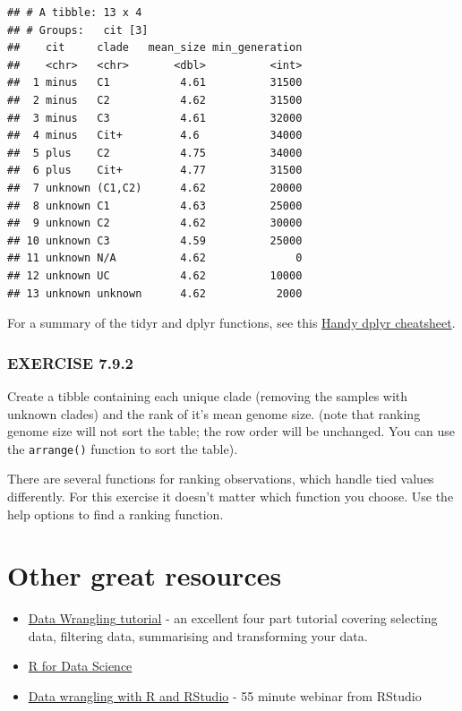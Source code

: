 \documentclass[
]{book}
\providecommand{\tightlist}{%
  \setlength{\itemsep}{0pt}\setlength{\parskip}{0pt}}
\begin{document}
\begin{verbatim}
## # A tibble: 13 x 4
## # Groups:   cit [3]
##    cit     clade   mean_size min_generation
##    <chr>   <chr>       <dbl>          <int>
##  1 minus   C1           4.61          31500
##  2 minus   C2           4.62          31500
##  3 minus   C3           4.61          32000
##  4 minus   Cit+         4.6           34000
##  5 plus    C2           4.75          34000
##  6 plus    Cit+         4.77          31500
##  7 unknown (C1,C2)      4.62          20000
##  8 unknown C1           4.63          25000
##  9 unknown C2           4.62          30000
## 10 unknown C3           4.59          25000
## 11 unknown N/A          4.62              0
## 12 unknown UC           4.62          10000
## 13 unknown unknown      4.62           2000
\end{verbatim}

For a summary of the tidyr and dplyr functions, see this \href{http://www.rstudio.com/wp-content/uploads/2015/02/data-wrangling-cheatsheet.pdf}{Handy dplyr cheatsheet}.

\hypertarget{exercise-7.9.2}{%
\subsubsection*{EXERCISE 7.9.2}\label{exercise-7.9.2}}

Create a tibble containing each unique clade (removing the samples with unknown clades) and the rank of it's mean genome size. (note that ranking genome size will not sort the table; the row order will be unchanged. You can use the \texttt{arrange()} function to sort the table).

There are several functions for ranking observations, which handle tied values differently. For this exercise it doesn't matter which function you choose. Use the help options to find a ranking function.

\hypertarget{other-great-resources}{%
\section{Other great resources}\label{other-great-resources}}

\begin{itemize}
\tightlist
\item
  \href{https://suzan.rbind.io/categories/tutorial/}{Data Wrangling tutorial} - an excellent four part tutorial covering selecting data, filtering data, summarising and transforming your data.
\item
  \href{http://r4ds.had.co.nz/}{R for Data Science}
\item
  \href{https://www.rstudio.com/resources/webinars/data-wrangling-with-r-and-rstudio/}{Data wrangling with R and RStudio} - 55 minute webinar from RStudio
\end{itemize}
\end{document}
